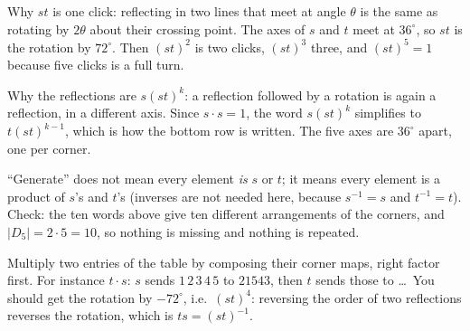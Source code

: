 \documentclass[10pt]{article}
\newcommand{\inv}{^{-1}}
\begin{document}
{\begin{minipage}[t]{744pt}
\begin{minipage}[t]{350pt}
\begin{why}
Why $st$ is one click: reflecting in two lines that meet at angle $\theta$ is the same as rotating by $2\theta$ about their crossing point. The axes of $s$ and $t$ meet at $36^\circ$, so $st$ is the rotation by $72^\circ$. Then $(st)^2$ is two clicks, $(st)^3$ three, and $(st)^5=1$ because five clicks is a full turn.
\end{why}
\begin{why}
Why the reflections are $s(st)^k$: a reflection followed by a rotation is again a reflection, in a different axis. Since $s\cdot s=1$, the word $s(st)^k$ simplifies to $t(st)^{k-1}$, which is how the bottom row is written. The five axes are $36^\circ$ apart, one per corner.
\end{why}
\begin{pitfall}
``Generate'' does not mean every element \emph{is} $s$ or $t$; it means every element is a product of $s$'s and $t$'s (inverses are not needed here, because $s\inv=s$ and $t\inv=t$). Check: the ten words above give ten different arrangements of the corners, and $|D_5|=2\cdot5=10$, so nothing is missing and nothing is repeated.
\end{pitfall}
\begin{tryit}
Multiply two entries of the table by composing their corner maps, right factor first. For instance $t\cdot s$: $s$ sends $1\,2\,3\,4\,5$ to $2 1 5 4 3$, then $t$ sends those to \ldots\ You should get the rotation by $-72^\circ$, i.e.\ $(st)^4$: reversing the order of two reflections reverses the rotation, which is $ts=(st)\inv$.
\end{tryit}
\end{minipage}
\end{minipage}
}
\end{document}
